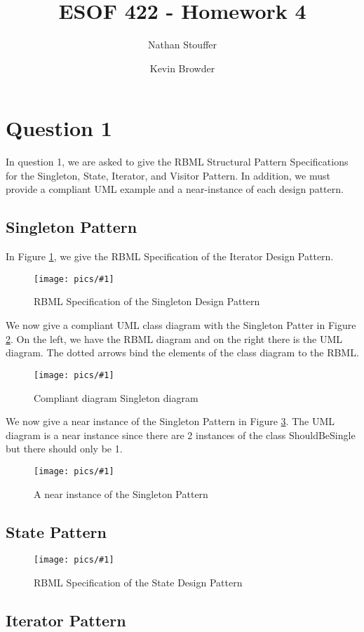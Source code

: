\documentclass{article}
\newcommand{\fig}[3]{ 
	\begin{figure}[h]
		\centering
		\caption{#3}
		\texttt{[image: pics/\#1]}
		\label{fig:#1}
	\end{figure} 
}
\begin{document}
	
\title{ESOF 422 - Homework 4}
\author{Nathan Stouffer \and Kevin Browder}

\maketitle
\newpage

\section*{Question 1}

In question 1, we are asked to give the RBML Structural Pattern Specifications for the Singleton, State, Iterator, and Visitor Pattern. In addition, we must provide a compliant UML example and a near-instance of each design pattern.

\subsection*{Singleton Pattern}

In Figure \ref{fig:singleton-rbml}, we give the RBML Specification of the Iterator Design Pattern.

\fig{singleton-rbml}{.4}{RBML Specification of the Singleton Design Pattern}

We now give a compliant UML class diagram with the Singleton Patter in Figure \ref{fig:singleton-inst}. On the left, we have the RBML diagram and on the right there is the UML diagram. The dotted arrows bind the elements of the class diagram to the RBML.

\fig{singleton-inst}{0.75}{Compliant diagram Singleton diagram}

We now give a near instance of the Singleton Pattern in Figure \ref{fig:singleton-ninst}. The UML diagram is a near instance since there are 2 instances of the class ShouldBeSingle but there should only be 1.

\fig{singleton-ninst}{0.5}{A near instance of the Singleton Pattern}

\subsection*{State Pattern}

\fig{state-rbml}{.95}{RBML Specification of the State Design Pattern}

\subsection*{Iterator Pattern}
\end{document}
